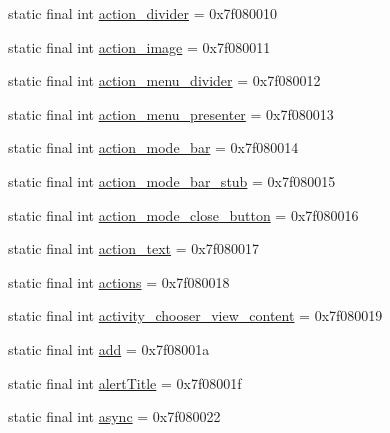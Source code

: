 \begin{DoxyCompactItemize}
\item 
static final int \mbox{\hyperlink{classandroid_1_1support_1_1design_1_1R_1_1id_a5dc7a5d798ad8acf89b1231cf68420fb}{action\+\_\+divider}} = 0x7f080010
\item 
static final int \mbox{\hyperlink{classandroid_1_1support_1_1design_1_1R_1_1id_acb819bbee75ff62ee394ad83be17e3f8}{action\+\_\+image}} = 0x7f080011
\item 
static final int \mbox{\hyperlink{classandroid_1_1support_1_1design_1_1R_1_1id_a0f35eb1a2d2a28b38375fbef3f3798b5}{action\+\_\+menu\+\_\+divider}} = 0x7f080012
\item 
static final int \mbox{\hyperlink{classandroid_1_1support_1_1design_1_1R_1_1id_af17d748c9baeae75dec2a1a33de1688a}{action\+\_\+menu\+\_\+presenter}} = 0x7f080013
\item 
static final int \mbox{\hyperlink{classandroid_1_1support_1_1design_1_1R_1_1id_a38039e35a65689233083e7e3151b5daf}{action\+\_\+mode\+\_\+bar}} = 0x7f080014
\item 
static final int \mbox{\hyperlink{classandroid_1_1support_1_1design_1_1R_1_1id_a8d5a8f9cedcaf7f3af65204145e77658}{action\+\_\+mode\+\_\+bar\+\_\+stub}} = 0x7f080015
\item 
static final int \mbox{\hyperlink{classandroid_1_1support_1_1design_1_1R_1_1id_af2b02b09f506afe0d25e461b80153398}{action\+\_\+mode\+\_\+close\+\_\+button}} = 0x7f080016
\item 
static final int \mbox{\hyperlink{classandroid_1_1support_1_1design_1_1R_1_1id_a05d4557ea8fc5ebff41e78c170df5189}{action\+\_\+text}} = 0x7f080017
\item 
static final int \mbox{\hyperlink{classandroid_1_1support_1_1design_1_1R_1_1id_a2ef75cb2972f53b7268bdff26e23fb2a}{actions}} = 0x7f080018
\item 
static final int \mbox{\hyperlink{classandroid_1_1support_1_1design_1_1R_1_1id_afee6612fa57475decd6b62b7f85daac8}{activity\+\_\+chooser\+\_\+view\+\_\+content}} = 0x7f080019
\item 
static final int \mbox{\hyperlink{classandroid_1_1support_1_1design_1_1R_1_1id_a5749fe11f06878af5297a17fb2022eb3}{add}} = 0x7f08001a
\item 
static final int \mbox{\hyperlink{classandroid_1_1support_1_1design_1_1R_1_1id_a4be5c3c6c6f023b785dcf8acc2414549}{alert\+Title}} = 0x7f08001f
\item 
static final int \mbox{\hyperlink{classandroid_1_1support_1_1design_1_1R_1_1id_ae9096dbba8310e9a37f618cc892223a3}{async}} = 0x7f080022
\item 

\end{DoxyCompactItemize}
